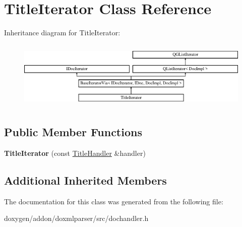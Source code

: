 \hypertarget{class_title_iterator}{}\section{Title\+Iterator Class Reference}
\label{class_title_iterator}
Inheritance diagram for Title\+Iterator\+:\begin{figure}[H]
\begin{center}
\leavevmode
\includegraphics[height=3.294118cm]{class_title_iterator}
\end{center}
\end{figure}
\subsection*{Public Member Functions}
\begin{DoxyCompactItemize}
\item 
\mbox{\label{class_title_iterator_a692fbee7a2d5d896db13adad4aa0bd4e}} 
{\bfseries Title\+Iterator} (const \mbox{\hyperlink{class_title_handler}{Title\+Handler}} \&handler)
\end{DoxyCompactItemize}
\subsection*{Additional Inherited Members}


The documentation for this class was generated from the following file\+:\begin{DoxyCompactItemize}
\item 
doxygen/addon/doxmlparser/src/dochandler.\+h\end{DoxyCompactItemize}
